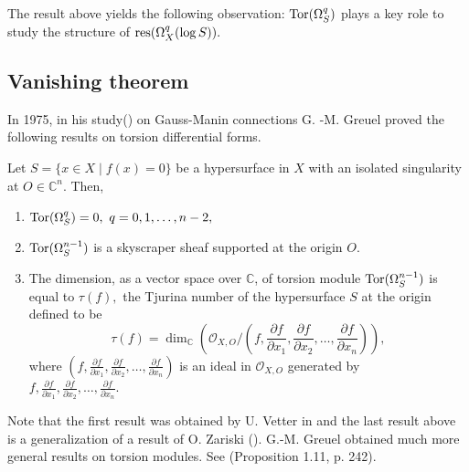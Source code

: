 \documentclass[pdftex]{arxsigma}
\begin{document}
The result above yields the following observation:
$  {\rm Tor}(\Omega_{S}^{q}) $  plays a key role to study the structure of $ {\rm res}(\Omega_X^{q}(\log S)). $


\subsection{Vanishing theorem}

In 1975, in his study(\cite{G}) on Gauss-Manin connections G. -M. Greuel proved the following results on torsion differential forms.

\begin{theorem}
Let $ S = \{ x \in X \mid f(x) = 0 \} $ be a hypersurface in $ X $ 
with an isolated singularity at $ O \in {\mathbb C}^n. $
Then, 
\begin{enumerate}
\item[(i)\ \ ]  $ {\rm Tor}(\Omega_S^{q}) = 0,\  q=0,1,\ldots,n-2, $

\item[(ii)\ ]  ${\rm Tor}(\Omega_S^{n-1}) $ is a skyscraper sheaf supported at the origin $O.$

\item[(iii)]  The dimension, as a vector space over ${\mathbb C}$, of torsion module  ${\rm Tor}(\Omega_S^{n-1}) $ is equal to $ \tau(f), $ the Tjurina number of the hypersurface $ S $ at the origin defined to be 
\begin{equation*}
 \tau(f) = \dim_{{\mathbb C}}\left({\mathcal O}_{X, O}/\left(f, \frac{\partial f}{\partial x_1}, \frac{\partial f}{\partial x_2},\ldots,\frac{\partial f}{\partial x_n}\right)\right),
\end{equation*}
where 
$ (f, \frac{\partial f}{\partial x_1}, \frac{\partial f}{\partial x_2},\ldots,
\frac{\partial f}{\partial x_n}) $
is an ideal in $ {\mathcal O}_{X,O} $ generated by \\ 
$ f, \frac{\partial f}{\partial x_1}, \frac{\partial f}{\partial x_2},\ldots,\frac{\partial f}{\partial x_n}. $
\end{enumerate}
\end{theorem}


Note that the first result was obtained by U. Vetter in \cite{V} and the last result above is a generalization of a result of O. Zariski (\cite{Z}). 
G.-M. Greuel obtained  much more general results on torsion modules. See \cite{G} (Proposition 1.11, p. 242).
\end{document}
